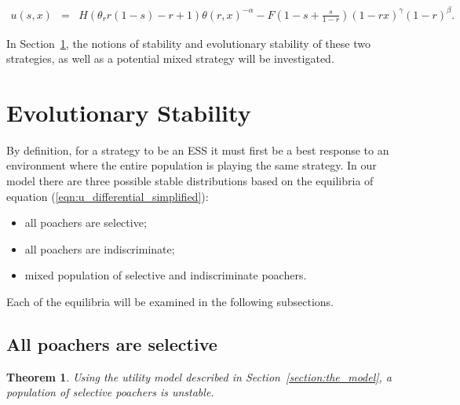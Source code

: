 \documentclass[10pt]{article}
\newtheorem{theorem}{Theorem}
\begin{document}
\begin{eqnarray}
\label{eqn:tutility2}
u(s, x) &=&
H (\theta_r r(1-s) - r + 1)\theta(r,x)^{-\alpha} - F\left(1-s + \frac{s}{1-r} \right)(1-rx)^{\gamma}(1-r)^{\beta} .
\end{eqnarray}

In Section~\ref{section:evolutionary_stability}, the notions of stability
and evolutionary stability of these two strategies, as well as a potential
mixed strategy will be investigated.

\section{Evolutionary Stability}\label{section:evolutionary_stability}

By definition, for a strategy to be an ESS it must first be a best response to an
environment where the entire population is playing the same strategy.
In our model there are three possible stable distributions based on the
equilibria of equation (\ref{eqn:u_differential_simplified}):

\begin{itemize}
    \item all poachers are selective;
    \item all poachers are indiscriminate;
    \item mixed population of selective and indiscriminate poachers.
\end{itemize}

\noindent Each of the equilibria will be examined in the following subsections.

\subsection{All poachers are selective}

\begin{theorem}\label{theorem:selective}
Using the utility model described in Section~\ref{section:the_model},
a population of selective poachers is unstable.
\end{theorem}
\end{document}
